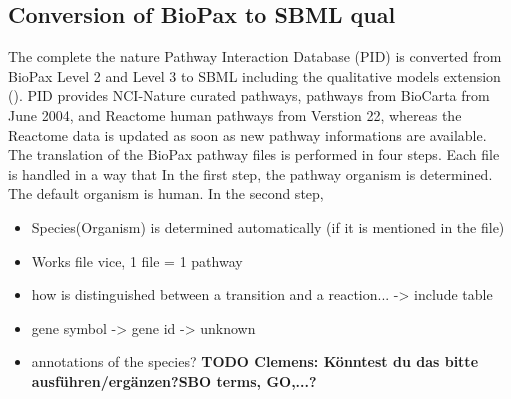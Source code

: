 \documentclass{bioinfo}
\begin{document}
\begin{methods}
\subsection{Conversion of BioPax to SBML qual}
The complete the nature Pathway Interaction Database (PID) is converted from BioPax Level 2 and Level 3 to SBML including the qualitative models extension (\citep{Schaefer2009}). 
PID provides NCI-Nature curated pathways, pathways from BioCarta from June 2004, and Reactome human pathways from Verstion 22, whereas the Reactome data is updated as soon as new pathway informations are available.\\
The translation of the BioPax pathway files is performed in four steps. 
Each file is handled in a way that 
In the first step, the pathway organism is determined. 
The default organism is human. 
In the second step,

\begin{itemize}
\item Species(Organism) is determined automatically (if it is mentioned in the file)
\item Works file vice, 1 file = 1 pathway
\item how is distinguished between a transition and a reaction... -> include table
\item gene symbol -> gene id -> unknown
\item annotations of the species? \textbf{TODO Clemens: K\"onntest du das bitte ausf\"uhren/erg\"anzen?SBO terms, GO,...?}
\end{itemize}



\end{methods}
\end{document}

